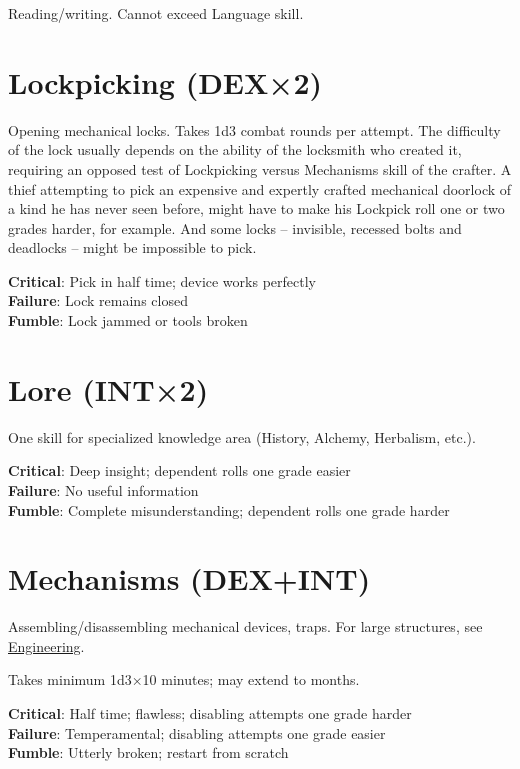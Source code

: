 \documentclass[10pt]{article}
\begin{document}
Reading/writing. Cannot exceed Language skill.


\section{Lockpicking (DEX×2)}
\label{skill:lockpicking}

Opening mechanical locks. Takes 1d3 combat rounds per attempt.
The difficulty of the lock usually depends on the ability of the locksmith who created it, requiring an opposed test of Lockpicking versus Mechanisms skill of the crafter.
A thief attempting to pick an expensive and expertly crafted mechanical doorlock of a kind he has never seen before, might have to make his Lockpick roll one or two grades harder, for example. And some locks – invisible, recessed bolts and deadlocks – might be impossible to pick.

\textbf{Critical}: Pick in half time; device works perfectly\\
\textbf{Failure}: Lock remains closed\\
\textbf{Fumble}: Lock jammed or tools broken

\section{Lore (INT×2)}
\label{skill:lore}

One skill for specialized knowledge area (History, Alchemy, Herbalism, etc.).

\textbf{Critical}: Deep insight; dependent rolls one grade easier\\
\textbf{Failure}: No useful information\\
\textbf{Fumble}: Complete misunderstanding; dependent rolls one grade harder

\section{Mechanisms (DEX+INT)}
\label{skill:mechanisms}

Assembling/disassembling mechanical devices, traps. For large structures, see \hyperref[skill:engineering]{Engineering}.

Takes minimum 1d3×10 minutes; may extend to months.

\textbf{Critical}: Half time; flawless; disabling attempts one grade harder\\
\textbf{Failure}: Temperamental; disabling attempts one grade easier\\
\textbf{Fumble}: Utterly broken; restart from scratch
\end{document}

